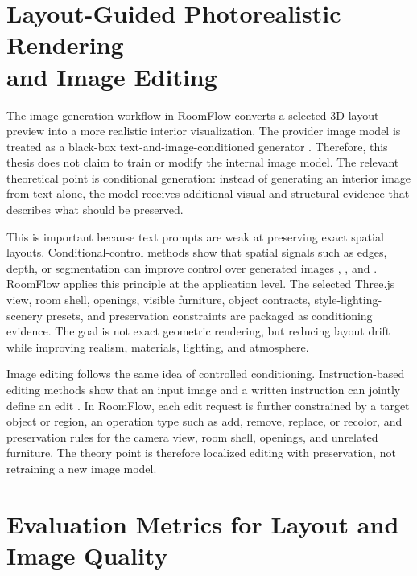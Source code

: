 \section[Layout-Guided Photorealistic Rendering and Image Editing]{\texorpdfstring{Layout-Guided Photorealistic Rendering\\and Image Editing}{Layout-Guided Photorealistic Rendering and Image Editing}}\label{sec:layout-conditioned-image-generation-and-editing}

The image-generation workflow in RoomFlow converts a selected 3D layout preview into a more realistic interior visualization. The provider image model is treated as a black-box text-and-image-conditioned generator \cite{OpenAI2026GptImage2}. Therefore, this thesis does not claim to train or modify the internal image model. The relevant theoretical point is conditional generation: instead of generating an interior image from text alone, the model receives additional visual and structural evidence that describes what should be preserved.

This is important because text prompts are weak at preserving exact spatial layouts. Conditional-control methods show that spatial signals such as edges, depth, or segmentation can improve control over generated images \cite{Ho2020DenoisingDiffusionProbabilistic}, \cite{Rombach2022HighResolutionImage}, and \cite{Zhang2023AddingConditionalControl}. RoomFlow applies this principle at the application level. The selected Three.js view, room shell, openings, visible furniture, object contracts, style-lighting-scenery presets, and preservation constraints are packaged as conditioning evidence. The goal is not exact geometric rendering, but reducing layout drift while improving realism, materials, lighting, and atmosphere.

Image editing follows the same idea of controlled conditioning. Instruction-based editing methods show that an input image and a written instruction can jointly define an edit \cite{Brooks2023Instructpix2pixLearningFollow}. In RoomFlow, each edit request is further constrained by a target object or region, an operation type such as add, remove, replace, or recolor, and preservation rules for the camera view, room shell, openings, and unrelated furniture. The theory point is therefore localized editing with preservation, not retraining a new image model.

\section{Evaluation Metrics for Layout and Image Quality}\label{sec:evaluation-metrics-for-layout-and-image-quality}

